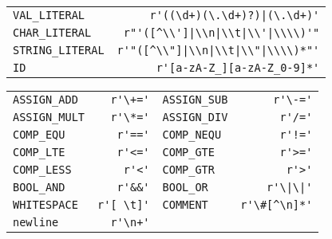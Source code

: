 \documentclass[10pt,landscape]{article}
\begin{document}
\begin{multicols}{3}
		\begin{tabular}{ l r }
			  \verb|VAL_LITERAL|    & \verb!r'((\d+)(\.\d+)?)|(\.\d+)'! \\
			  \verb|CHAR_LITERAL| & \verb!r"'([^\\']|\\n|\\t|\\'|\\\\)'"! \\
			  \verb|STRING_LITERAL| & \verb!r'"([^\\"]|\\n|\\t|\\"|\\\\)*"'!\\
			  \verb|ID| & \verb|r'[a-zA-Z_][a-zA-Z_0-9]*'|
		\end{tabular} 
		\begin{tabular}{ l r | l r }
			  \verb|ASSIGN_ADD| & \verb|r'\+='| &
			  \verb|ASSIGN_SUB| & \verb|r'\-='| \\
			  \verb|ASSIGN_MULT| & \verb|r'\*='| &
			  \verb|ASSIGN_DIV| & \verb|r'/='| \\
			  \verb|COMP_EQU| & \verb|r'=='| &
			  \verb|COMP_NEQU| & \verb|r'!='| \\
			  \verb|COMP_LTE| & \verb|r'<='| &
			  \verb|COMP_GTE| & \verb|r'>='| \\
			  \verb|COMP_LESS| & \verb|r'<'| &
			  \verb|COMP_GTR| & \verb|r'>'| \\
			  \verb|BOOL_AND| & \verb|r'&&'| &
			  \verb|BOOL_OR| & \verb!r'\|\|'! \\
			  \verb|WHITESPACE| & \verb|r'[ \t]'| &
			  \verb|COMMENT| & \verb|r'\#[^\n]*'| \\
			  \verb|newline| & \verb|r'\n+'| 
		\end{tabular} 
		

\end{multicols}
\end{document}
